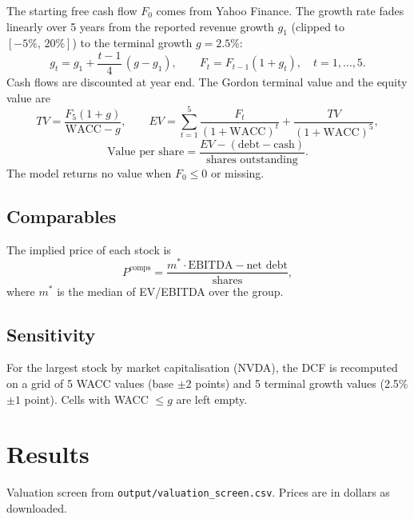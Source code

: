 \documentclass[11pt,a4paper]{article}
\begin{document}
The starting free cash flow $F_0$ comes from Yahoo Finance. The growth rate fades linearly over 5 years from the reported revenue growth $g_1$ (clipped to $[-5\%,\,20\%]$) to the terminal growth $g=2.5\%$:
\begin{equation}
g_t=g_1+\frac{t-1}{4}\,(g-g_1),\qquad F_t=F_{t-1}(1+g_t),\quad t=1,\dots,5.
\end{equation}
Cash flows are discounted at year end. The Gordon terminal value and the equity value are
\begin{equation}
TV=\frac{F_5(1+g)}{\text{WACC}-g},\qquad
EV=\sum_{t=1}^{5}\frac{F_t}{(1+\text{WACC})^t}+\frac{TV}{(1+\text{WACC})^5},
\end{equation}
\begin{equation}
\text{Value per share}=\frac{EV-(\text{debt}-\text{cash})}{\text{shares outstanding}}.
\end{equation}
The model returns no value when $F_0\le0$ or missing.

\subsection{Comparables}

The implied price of each stock is
\begin{equation}
P^{\text{comps}}=\frac{m^{\ast}\cdot\text{EBITDA}-\text{net debt}}{\text{shares}},
\end{equation}
where $m^{\ast}$ is the median of EV/EBITDA over the group.

\subsection{Sensitivity}

For the largest stock by market capitalisation (NVDA), the DCF is recomputed on a grid of 5 WACC values (base $\pm2$ points) and 5 terminal growth values (2.5\% $\pm1$ point). Cells with WACC $\le g$ are left empty.

\section{Results}

Valuation screen from \texttt{output/valuation\_screen.csv}. Prices are in dollars as downloaded.
\end{document}
